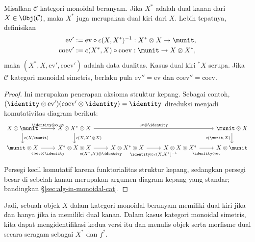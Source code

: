 \begin{lemma}\label{prop:braided-dual}
	Misalkan $\mathcal{C}$ kategori monoidal beranyam. Jika $X^*$ adalah dual
	kanan dari $X\in\Obj(\mathcal{C})$, maka $X^*$ juga merupakan dual kiri
	dari $X$. Lebih tepatnya, definisikan
	\begin{align*}
		\mathrm{ev}' & := \mathrm{ev} \circ c(X, X^*)^{-1}: X^* \otimes X \to \munit, \\
		\mathrm{coev}' & := c(X^*, X) \circ \mathrm{coev}: \munit \to X \otimes X^* ,
	\end{align*}
	maka $(X^*,X,\mathrm{ev}',\mathrm{coev}')$ adalah data dualitas. Kasus
dual kiri ${}^*X$ serupa. Jika $\mathcal{C}$ kategori monoidal simetris,
berlaku pula $\mathrm{ev}''=\mathrm{ev}$ dan
$\mathrm{coev}''=\mathrm{coev}$.
\end{lemma}
\begin{proof}
	Ini merupakan penerapan aksioma struktur kepang. Sebagai contoh,
	$(\identity\otimes\mathrm{ev}')(\mathrm{coev}'\otimes\identity)
	=\identity$ direduksi menjadi komutativitas diagram berikut:
	\[\begin{tikzcd}
		X \otimes \munit \arrow[d, "{c(X, \munit)}"] \arrow[r, "{\identity \otimes \mathrm{coev}}"] & X \otimes X^* \otimes X \arrow[d, "{c(X, X^* \otimes X)}"] \arrow[rrr, "{\mathrm{ev} \otimes \identity}"] & & & \munit \otimes X \arrow[d, "{c(\munit, X)}"'] \\
		\munit \otimes X \arrow[r, "{\mathrm{coev} \otimes \identity}"' inner sep=0.6em] & X^* \otimes X \otimes X \arrow[r, "{c(X^*, X) \otimes \identity}"' inner sep=0.6em] & X \otimes X^* \otimes X \arrow[r, "{\identity \otimes c(X, X^*)^{-1}}"' inner sep=0.6em] & X \otimes X \otimes X^* \arrow[r, "{\identity \otimes \mathrm{ev}}"' inner sep=0.6em] & X \otimes \munit
	\end{tikzcd}\]
	Persegi kecil komutatif karena funktorialitas struktur kepang, sedangkan
persegi besar di sebelah kanan merupakan argumen diagram kepang yang
standar; bandingkan \S\ref{sec:alg-in-monoidal-cat}.
\end{proof}

Jadi, sebuah objek $X$ dalam kategori monoidal beranyam memiliki dual kiri
jika dan hanya jika ia memiliki dual kanan. Dalam kasus kategori monoidal
simetris, kita dapat mengidentifikasi kedua versi itu dan menulis objek
serta morfisme dual secara seragam sebagai $X^*$ dan $f^*$.

